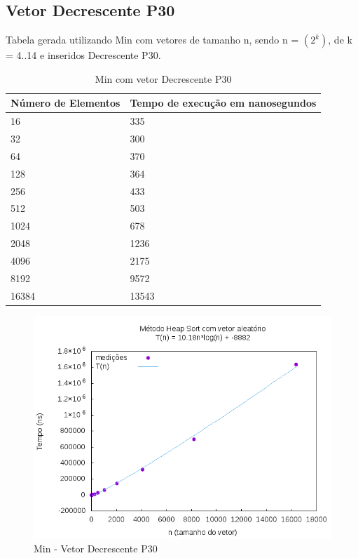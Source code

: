 \documentclass[12pt,a4paper,twoside]{report}
\begin{document}
\subsection{Vetor Decrescente P30}
Tabela gerada utilizando Min com vetores de tamanho n, sendo n = $(2^k)$, de k = 4..14 e inseridos Decrescente P30.
\begin{table}[H]
\centering
\caption{Min com vetor Decrescente P30}
\label{my-label}
\begin{tabular}{|l|l|}
\hline
\multicolumn{1}{|c|}{\textbf{Número de Elementos}} & \multicolumn{1}{c|}{\textbf{Tempo de execução em nanosegundos}} \\ \hline
16 & 335 \\ \hline
32 & 300 \\ \hline
64 & 370 \\ \hline
128 & 364 \\ \hline
256 & 433 \\ \hline
512 & 503 \\ \hline
1024 & 678 \\ \hline
2048 & 1236 \\ \hline
4096 & 2175 \\ \hline
8192 & 9572 \\ \hline
16384 & 13543 \\ \hline

\end{tabular}
\end{table}

\begin{figure}[H]
    \centering
    \includegraphics[width=0.7\linewidth]{graficos/HeapSort/vIntAleatorio/vIntAleatorio.png}
  \caption{Min - Vetor Decrescente P30}
\end{figure}
\end{document}

